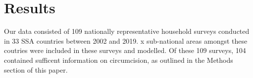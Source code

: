 \documentclass{article}
\begin{document}



\section{Results}
\label{sec:orgfc68fc8}


Our data consisted of 109 nationally representative household surveys conducted in 33 SSA countries between 2002 and 2019.
x sub-national areas amongst these coutries were included in these surveys and modelled.
Of these 109 surveys, 104 contained sufficent information on circumcision, as outlined in the Methods section of this paper. 
\end{document}
